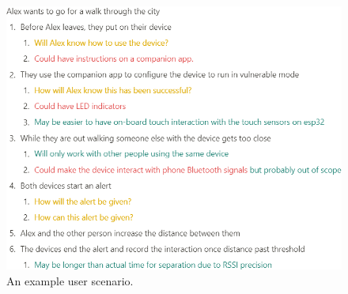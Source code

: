 \documentclass{l4proj}
\begin{document}
\begin{appendices}
    \begin{figure}[!htb]
        \centering
        \includegraphics[width=1.0\linewidth]{images/user_story.png}

        \caption{ An example user scenario. }

        \label{fig:alex_user_scenario}
    \end{figure}

\end{appendices}






\end{document}
